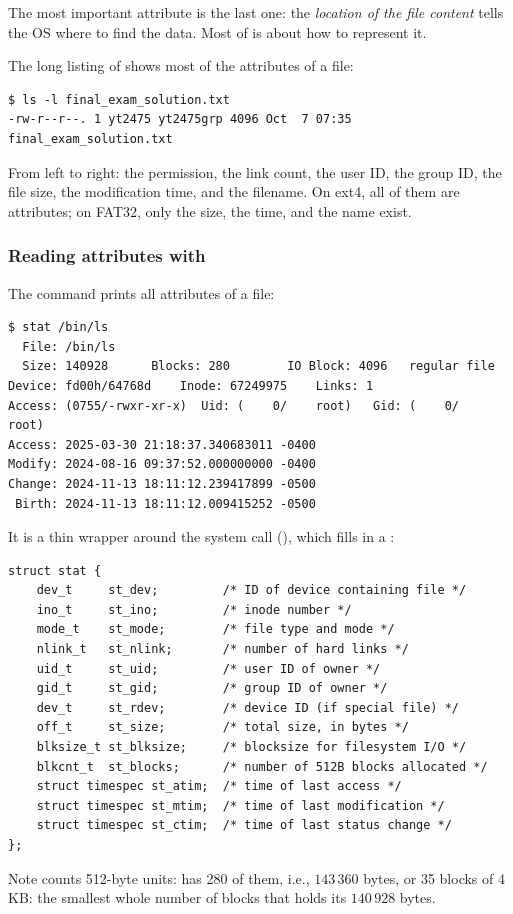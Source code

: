 The most important attribute is the last one: the \emph{location of the file content} tells the OS where to find the data. Most of  is about how to represent it.

\begin{example}
\label{ex:lsattr}
The long listing of  shows most of the attributes of a file:
\begin{lstlisting}[style=sh]
$ ls -l final_exam_solution.txt
-rw-r--r--. 1 yt2475 yt2475grp 4096 Oct  7 07:35 final_exam_solution.txt
\end{lstlisting}
  From left to right: the permission, the link count, the user ID, the group ID, the file size, the modification time, and the filename. On ext4, all of them are attributes; on FAT32, only the size, the time, and the name exist.
\end{example}

\subsubsection{Reading attributes with }
The command  prints all attributes of a file:
\begin{lstlisting}[style=sh]
$ stat /bin/ls
  File: /bin/ls
  Size: 140928      Blocks: 280        IO Block: 4096   regular file
Device: fd00h/64768d    Inode: 67249975    Links: 1
Access: (0755/-rwxr-xr-x)  Uid: (    0/    root)   Gid: (    0/    root)
Access: 2025-03-30 21:18:37.340683011 -0400
Modify: 2024-08-16 09:37:52.000000000 -0400
Change: 2024-11-13 18:11:12.239417899 -0500
 Birth: 2024-11-13 18:11:12.009415252 -0500
\end{lstlisting}
It is a thin wrapper around the  system call (), which fills in a :
\begin{lstlisting}
struct stat {
    dev_t     st_dev;         /* ID of device containing file */
    ino_t     st_ino;         /* inode number */
    mode_t    st_mode;        /* file type and mode */
    nlink_t   st_nlink;       /* number of hard links */
    uid_t     st_uid;         /* user ID of owner */
    gid_t     st_gid;         /* group ID of owner */
    dev_t     st_rdev;        /* device ID (if special file) */
    off_t     st_size;        /* total size, in bytes */
    blksize_t st_blksize;     /* blocksize for filesystem I/O */
    blkcnt_t  st_blocks;      /* number of 512B blocks allocated */
    struct timespec st_atim;  /* time of last access */
    struct timespec st_mtim;  /* time of last modification */
    struct timespec st_ctim;  /* time of last status change */
};
\end{lstlisting}
Note  counts 512-byte units:  has 280 of them, i.e., $143\,360$ bytes, or 35 blocks of 4\,KB: the smallest whole number of blocks that holds its $140\,928$ bytes.

